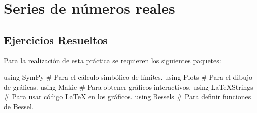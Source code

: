\documentclass[
  a4paper,
]{scrreport}
\newenvironment{Shaded}{\begin{snugshade}}{\end{snugshade}}
\newcommand{\BuiltInTok}[1]{\textcolor[rgb]{0.00,0.23,0.31}{#1}}
\newcommand{\CommentTok}[1]{\textcolor[rgb]{0.37,0.37,0.37}{#1}}
\newcommand{\ImportTok}[1]{\textcolor[rgb]{0.00,0.46,0.62}{#1}}
\theoremstyle{definition}
\theoremstyle{remark}
\begin{document}

\chapter{Series de números reales}\label{series-de-nuxfameros-reales}

\section{Ejercicios Resueltos}\label{ejercicios-resueltos-5}

Para la realización de esta práctica se requieren los siguientes
paquetes:

\begin{Shaded}
\begin{Highlighting}[]
\ImportTok{using} \BuiltInTok{SymPy}  \CommentTok{\# Para el cálculo simbólico de límites.}
\ImportTok{using} \BuiltInTok{Plots}  \CommentTok{\# Para el dibujo de gráficas.}
\ImportTok{using} \BuiltInTok{Makie} \CommentTok{\# Para obtener gráficos interactivos.}
\ImportTok{using} \BuiltInTok{LaTeXStrings}  \CommentTok{\# Para usar código LaTeX en los gráficos.}
\ImportTok{using} \BuiltInTok{Bessels}  \CommentTok{\# Para definir funciones de Bessel.}
\end{Highlighting}
\end{Shaded}
\end{document}
